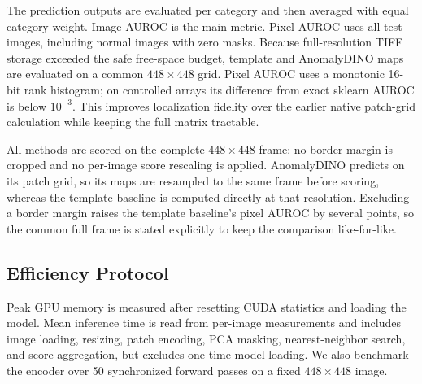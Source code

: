 The prediction outputs are evaluated per category and then averaged with equal
category weight. Image AUROC is the main metric. Pixel AUROC uses all test
images, including normal images with zero masks. Because full-resolution
TIFF storage exceeded the safe free-space budget, template and AnomalyDINO maps
are evaluated on a common $448\times448$ grid. Pixel AUROC uses a monotonic
16-bit rank histogram; on controlled arrays its difference from exact sklearn
AUROC is below $10^{-3}$. This improves localization fidelity over the earlier
native patch-grid calculation while keeping the full matrix tractable.

All methods are scored on the complete $448\times448$ frame: no border margin is
cropped and no per-image score rescaling is applied. AnomalyDINO predicts on its
patch grid, so its maps are resampled to the same frame before scoring, whereas
the template baseline is computed directly at that resolution. Excluding a
border margin raises the template baseline's pixel AUROC by several points, so
the common full frame is stated explicitly to keep the comparison like-for-like.

\subsection{Efficiency Protocol}
Peak GPU memory is measured after resetting CUDA statistics and loading the
model. Mean inference time is read from per-image measurements and includes
image loading, resizing, patch encoding, PCA masking, nearest-neighbor search,
and score aggregation, but excludes one-time model loading. We also benchmark
the encoder over 50 synchronized forward passes on a fixed $448\times448$
image.
